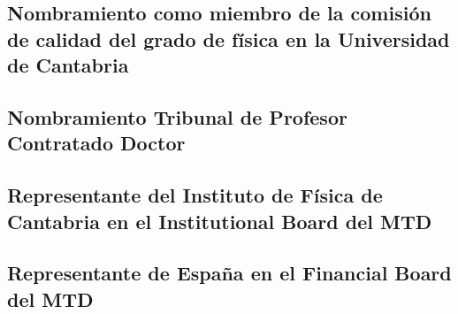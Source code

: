\documentclass[a4paper, 11pt, twoside, openright]{report}
\begin{document}
\subsection{Nombramiento como miembro de la comisión de calidad del grado de física en la Universidad de Cantabria}

\subsection{Nombramiento Tribunal de Profesor Contratado Doctor}

\subsection{Representante del Instituto de Física de Cantabria en el Institutional Board del MTD}

\subsection{Representante de España en el Financial Board del MTD}

\end{document}
